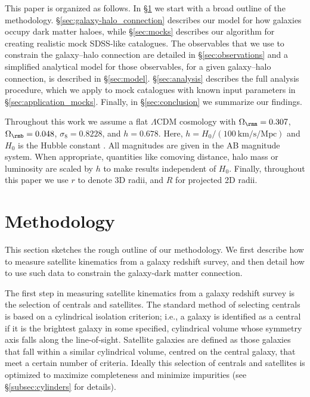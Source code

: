 \documentclass[fleqn,usenatbib,useAMS]{mnras}
\begin{document}
	This paper is organized as follows. In \S\ref{sec:methodology} we start with a broad outline of the methodology. \S\ref{sec:galaxy-halo_connection} describes our model for how galaxies occupy dark matter haloes, while \S\ref{sec:mocks} describes our algorithm for creating realistic mock SDSS-like catalogues. The observables that we use to constrain the galaxy--halo connection are detailed in \S\ref{sec:observations} and a simplified analytical model for those observables, for a given galaxy--halo connection, is described in \S\ref{sec:model}. \S\ref{sec:analysis} describes the full analysis procedure, which we apply to mock catalogues with known input parameters in \S\ref{sec:application_mocks}. Finally, in \S\ref{sec:conclusion} we summarize our findings.
	
	Throughout this work we assume a flat $\Lambda$CDM cosmology with $\Omega_\rmm = 0.307$, $\Omega_\rmb = 0.048$, $\sigma_8 = 0.8228$, and $h = 0.678$. Here, $h = H_0 / (100 \ \mathrm{km/s/Mpc})$ and $H_0$ is the Hubble constant \citep{Planck14}. All magnitudes are given in the AB magnitude system. When appropriate, quantities like comoving distance, halo mass or luminosity are scaled by $h$ to make results independent of $H_0$. Finally, throughout this paper we use $r$ to denote 3D radii, and $R$ for projected 2D radii.
	
	\section{Methodology}
	\label{sec:methodology}
	
	This section sketches the rough outline of our methodology. We first describe how to measure satellite kinematics from a galaxy redshift survey, and then detail how to use such data to constrain the galaxy-dark matter connection.
	
	The first step in measuring satellite kinematics from a galaxy redshift survey is the selection of centrals and satellites. The standard method of selecting centrals is based on a cylindrical isolation criterion; i.e., a galaxy is identified as a central if it is the brightest galaxy in some specified, cylindrical volume whose symmetry axis falls along the line-of-sight. Satellite galaxies are defined as those galaxies that fall within a similar cylindrical volume, centred on the central galaxy, that meet a certain number of criteria. Ideally this selection of centrals and satellites is optimized to maximize completeness and minimize impurities (see \S\ref{subsec:cylinders} for details).
	
\end{document}
